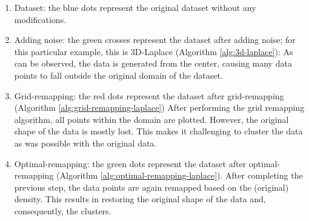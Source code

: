 \begin{enumerate}
  \item Dataset: the blue dots represent the original dataset without any modifications.
  \item Adding noise: the green crosses represent the dataset after adding noise; for this particular example, this is 3D-Laplace (Algorithm \ref{alg:3d-laplace}):
        As can be observed, the data is generated from the center, causing many data points to fall outside the original domain of the dataset.
  \item Grid-remapping: the red dots represent the dataset after grid-remapping (Algorithm \ref{alg:grid-remapping-laplace})
        After performing the grid remapping algorithm, all points within the domain are plotted.
        However, the original shape of the data is mostly lost.
        This makes it challenging to cluster the data as was possible with the original data.
  \item Optimal-remapping: the green dots represent the dataset after optimal-remapping (Algorithm \ref{alg:optimal-remapping-laplace}).
        After completing the previous step, the data points are again remapped based on the (original) density.
        This results in restoring the original shape of the data and, consequently, the clusters.
\end{enumerate}
